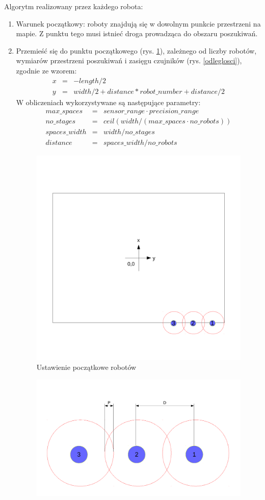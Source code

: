\documentclass[a4paper, 12pt]{article}
\begin{document}
		Algorytm realizowany przez każdego robota:
		\begin{enumerate}
		\item Warunek początkowy: roboty znajdują się w dowolnym punkcie przestrzeni na mapie. Z punktu tego musi istnieć droga prowadząca do obszaru poszukiwań.
		\item Przemieść się do punktu początkowego (rys. \ref{plansza}), zależnego od liczby robotów, wymiarów przestrzeni poszukiwań i zasięgu czujników (rys. \ref{odleglosci}), zgodnie ze wzorem:		
		\begin{eqnarray}
		x &=& -length / 2 \\
		y &=& width / 2 + distance * robot\_number + distance / 2
		\end{eqnarray}
		W obliczeniach wykorzystywane są następujące parametry:
		\begin{eqnarray}
		max\_spaces &=& sensor\_range \cdot precision\_range \\
		no\_stages &=& ceil(width / (max\_spaces \cdot no\_robots))\\
		spaces\_width &=& width / no\_stages\\
		distance &=& spaces\_width/no\_robots
		\end{eqnarray}
		\begin{figure}[h!]
			\centering
			\includegraphics*[width=0.7\columnwidth]{img/plansza.pdf}
			\caption{Ustawienie początkowe robotów}
			\label{plansza}
		\end{figure}
		\begin{figure}[h!]
			\centering
			\includegraphics*[width=0.7\columnwidth]{img/odleglosci.pdf}

\end{figure}
\end{enumerate}
\end{document}
